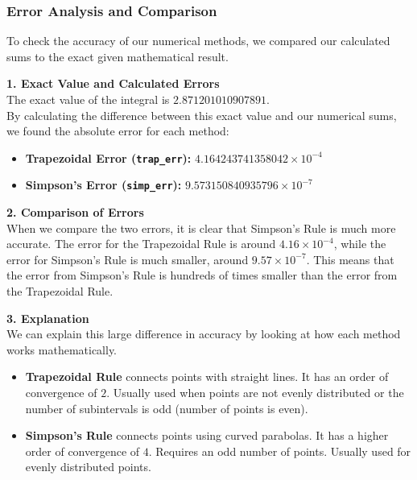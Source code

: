 \documentclass{article}
\begin{document}
\vspace{10pt}
\subsubsection{Error Analysis and Comparison}

To check the accuracy of our numerical methods, we compared our calculated sums to the exact given mathematical result.

\vspace{5pt}
\noindent \textbf{1. Exact Value and Calculated Errors} \\
The exact value of the integral is $2.871201010907891$. \\
By calculating the difference between this exact value and our numerical sums, we found the absolute error for each method:
\begin{itemize}
    \item \textbf{Trapezoidal Error (\texttt{trap\_err}):} $4.164243741358042 \times 10^{-4}$
    \item \textbf{Simpson's Error (\texttt{simp\_err}):} $9.573150840935796 \times 10^{-7}$
\end{itemize}

\vspace{5pt}
\noindent \textbf{2. Comparison of Errors} \\
When we compare the two errors, it is clear that Simpson's Rule is much more accurate. The error for the Trapezoidal Rule is around $4.16 \times 10^{-4}$, while the error for Simpson's Rule is much smaller, around $9.57 \times 10^{-7}$. This means that the error from Simpson's Rule is hundreds of times smaller than the error from the Trapezoidal Rule.

\vspace{5pt}
\noindent \textbf{3. Explanation} \\
We can explain this large difference in accuracy by looking at how each method works mathematically.
\begin{itemize}
    \item \textbf{Trapezoidal Rule} connects points with straight lines. It has an order of convergence of $2$. Usually used when points are not evenly distributed or the number of subintervals is odd (number of points is even).
    \item \textbf{Simpson's Rule} connects points using curved parabolas. It has a higher order of convergence of $4$. Requires an odd number of points. Usually used for evenly distributed points. 
\end{itemize}
\end{document}
